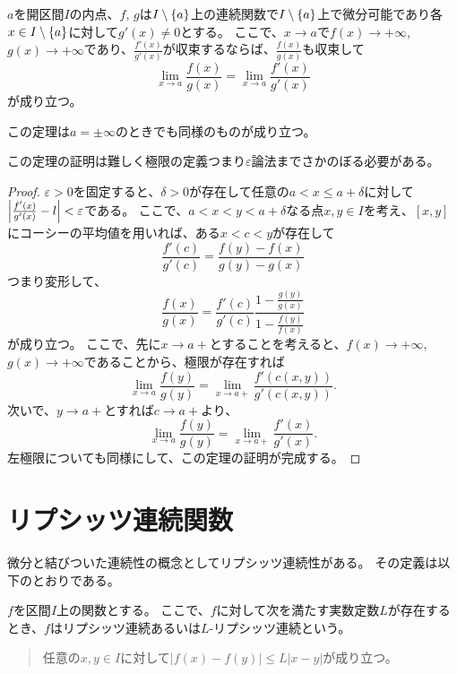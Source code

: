 \begin{theorem}[ロピタルの定理２]
$a$を開区間$I$の内点、$f$, $g$は$I\setminus\{a\}$上の連続関数で$I\setminus\{a\}$上で微分可能であり各$x \in I\setminus\{a\}$に対して$g'(x) \ne 0$とする。
ここで、$x \to a$で$f(x) \to +\infty$, $g(x) \to +\infty$であり、$\frac{f'(x)}{g'(x)}$が収束するならば、$\frac{f(x)}{g(x)}$も収束して
$$
\lim_{x \to a}\frac{f(x)}{g(x)} = \lim_{x \to a}\frac{f'(x)}{g'(x)}
$$
が成り立つ。
\end{theorem}

\begin{remark}
この定理は$a = \pm \infty$のときでも同様のものが成り立つ。
\end{remark}

この定理の証明は難しく極限の定義つまり$\varepsilon$論法までさかのぼる必要がある。

\begin{proof}
$\varepsilon > 0$を固定すると、$\delta > 0$が存在して任意の$a < x \le a+\delta$に対して$\abs{\frac{f'(x)}{g'(x)}-l} < \varepsilon$である。
ここで、$a < x < y < a+\delta$なる点$x, y \in I$を考え、$[x, y]$にコーシーの平均値を用いれば、ある$x < c < y$が存在して
$$
\frac{f'(c)}{g'(c)} = \frac{f(y)-f(x)}{g(y)-g(x)}
$$
つまり変形して、
$$
\frac{f(x)}{g(x)} = \frac{f'(c)}{g'(c)}\frac{1-\frac{g(y)}{g(x)}}{1-\frac{f(y)}{f(x)}}
$$
が成り立つ。
ここで、先に$x \to a+$とすることを考えると、$f(x) \to +\infty$, $g(x) \to +\infty$であることから、極限が存在すれば
$$
\lim_{x \to a}\frac{f(y)}{g(y)} = \lim_{x \to a+}\frac{f'(c(x, y))}{g'(c(x, y))}.
$$
次いで、$y \to a+$とすれば$c \to a+$より、
$$
\lim_{x \to a}\frac{f(y)}{g(y)} = \lim_{x \to a+}\frac{f'(x)}{g'(x)}.
$$
左極限についても同様にして、この定理の証明が完成する。
\end{proof}

\section{リプシッツ連続関数}

微分と結びついた連続性の概念としてリプシッツ連続性がある。
その定義は以下のとおりである。

\begin{definition}[リプシッツ連続関数]
$f$を区間$I$上の関数とする。
ここで、$f$に対して次を満たす実数定数$L$が存在するとき、$f$はリプシッツ連続あるいは$L$-リプシッツ連続という。
\begin{quote}
任意の$x, y \in I$に対して$|f(x)-f(y)| \le L|x-y|$が成り立つ。
\end{quote}
\end{definition}

